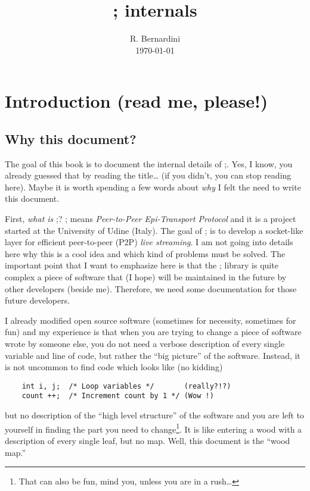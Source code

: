\documentclass[a4paper]{medusabook}
\title{\ppmtp; internals}
\author{R. Bernardini\\ {\today}}
\begin{document}
\tableofcontents
\chapter{Introduction (read me, please!)}

\section{Why this document?}
\label{sect:0;medusa_book}

The goal of this book is to document the internal details of
\ppmtp;. Yes, I know, you already guessed that by reading the
title\ldots{} (if you didn't, you can stop reading here).  Maybe it is
worth spending a few words about \emph{why} I felt the need to write
this document.

First, \emph{what is} \ppmtp;? \ppmtp; means \emph{Peer-to-Peer
  Epi-Transport Protocol} and it is a project started at the University
  of Udine (Italy).  The goal of \ppmtp; is to develop a socket-like
  layer for efficient peer-to-peer (P2P) \emph{live streaming}.  I am
  not going into details here why this is a cool idea and which kind
  of problems must be solved.  The important point that I want to
  emphasize here is that the \ppmtp; library is quite complex a piece
  of software that (I hope) will be maintained in the future by other
  developers (beside me).  Therefore, we need some documentation for
  those future developers.

I already modified open source software (sometimes for necessity,
sometimes for fun) and my experience is that when you are trying to
change a piece of software wrote by someone else, you do not need a
verbose description of every single variable and line of code, but
rather the ``big picture'' of the software.  Instead, it is not
uncommon to find code which looks like (no kidding)

\begin{verbatim}
    int i, j;  /* Loop variables */       (really?!?)
    count ++;  /* Increment count by 1 */ (Wow !)
\end{verbatim}

\noindent
but no description of the ``high level structure'' of the software and
you are left to yourself in finding the part you need to
change\footnote{That can also be fun, mind you, unless you are in a
rush\ldots}.  It is like entering a wood with a description of every
single leaf, but no map.  Well, this document is the ``wood map.''
\end{document}
